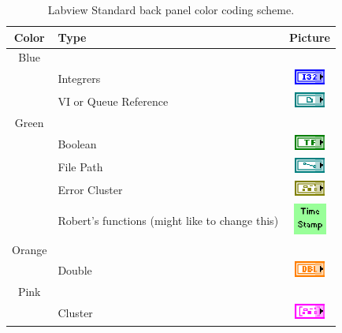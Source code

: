 \begin{table}[h]
\centering
\caption{Labview Standard back panel color coding scheme.}
\begin{tabular}{clc}
\hline\hline
Color	& Type								& Picture															\\
\hline
Blue		& 									& 																\\\hline
		& Integrers							& \includegraphics[height=0.2in]{Figures/ColorCoding_Int.eps}					\\\hline
		& VI or Queue Reference					& \includegraphics[height=0.2in]{Figures/ColorCoding_VIReference.eps}			\\\hline
Green	&									&																\\\hline
		& Boolean								& \includegraphics[height=0.2in]{Figures/ColorCoding_Bool.eps}				\\\hline
		& File Path							& \includegraphics[height=0.2in]{Figures/ColorCoding_FilePath.eps}				\\\hline
		& Error Cluster							& \includegraphics[height=0.2in]{Figures/ColorCoding_Error.eps}				\\\hline
		& Robert's functions	(might like to change this) 	& \includegraphics[height=0.4in]{Figures/ColorCoding_Custom.eps}				\\\hline
Orange	& 									& 																\\\hline
		& Double								& \includegraphics[height=0.2in]{Figures/ColorCoding_Float.eps}				\\\hline
Pink		&									&																\\\hline
		& Cluster								& \includegraphics[height=0.2in]{Figures/ColorCoding_Cluster.eps}				\\\hline

\end{tabular}
\end{table}
